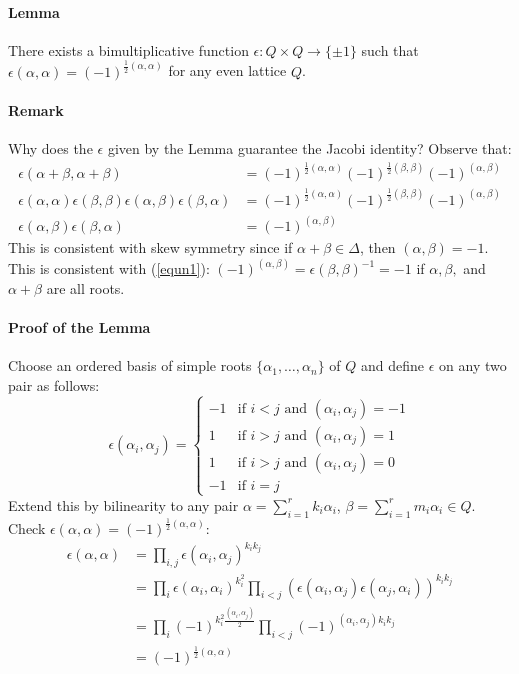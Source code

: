 \documentclass[11pt]{article}
\begin{document}
\paragraph{Lemma}
There exists a bimultiplicative function $\epsilon : Q \times Q \rightarrow
\{ \pm 1 \}$ such that $\epsilon(\alpha,\alpha)=(-1)^{\frac{1}{2}(\alpha,
\alpha)}$ for any even lattice $Q$.

\paragraph{Remark} Why does the $\epsilon$ given by the Lemma guarantee
the Jacobi identity? Observe that:
\begin{align*}
\epsilon(\alpha+\beta,\alpha+\beta)&=(-1)^{\frac{1}{2}(\alpha,\alpha)}
(-1)^{\frac{1}{2}(\beta,\beta)}(-1)^{(\alpha,\beta)} \\
\epsilon(\alpha,\alpha)\epsilon(\beta,\beta)\epsilon(\alpha,\beta)\epsilon(
\beta,\alpha)&= (-1)^{\frac{1}{2}(\alpha,\alpha)}
(-1)^{\frac{1}{2}(\beta,\beta)}(-1)^{(\alpha,\beta)} \\
\epsilon(\alpha,\beta)\epsilon(\beta,\alpha)&=(-1)^{(\alpha,\beta)}
\end{align*}
This is consistent with skew symmetry since if $\alpha+\beta \in \Delta$, then
$(\alpha,\beta)=-1$. This is consistent with (\ref{equn1}): $(-1)^{(\alpha,
\beta)}=\epsilon(\beta,\beta)^{-1}=-1$ if $\alpha, \beta,$ and $\alpha+\beta$
are all roots.

\paragraph{Proof of the Lemma}
Choose an ordered basis of simple roots $\{ \alpha_1, \dots , \alpha_n \}$
of $Q$ and define $\epsilon$ on any two pair as follows:
\begin{equation*}
\epsilon(\alpha_i,\alpha_j)= \begin{cases}
-1 & \text{if $i<j$ and $(\alpha_i,\alpha_j)=-1$} \\
1  & \text{if $i>j$ and $(\alpha_i,\alpha_j)=1$} \\
1  & \text{if $i>j$ and $(\alpha_i,\alpha_j)=0$} \\
-1 & \text{if $i=j$} \end{cases}
\end{equation*}
Extend this by bilinearity to any pair $\alpha = \sum_{i=1}^r k_i\alpha_i$,
$\beta=\sum_{i=1}^r m_i \alpha_i \in Q$. Check $\epsilon(\alpha,\alpha)
=(-1)^{\frac{1}{2}(\alpha,\alpha)}$:
\begin{align*}
\epsilon(\alpha,\alpha) &= \prod_{i,j}\epsilon(\alpha_i,\alpha_j)^{k_ik_j} \\
 &= \prod_i \epsilon(\alpha_i,\alpha_i)^{k_i^2} \prod_{i<j} \left( 
\epsilon(\alpha_i,\alpha_j)\epsilon(\alpha_j,\alpha_i) \right)^{k_ik_j} \\
&= \prod_i (-1)^{k_i^2 \frac{(\alpha_i,\alpha_j)}{2}}\prod_{i<j}(-1)^{(
\alpha_i,\alpha_j)k_ik_j} \\
&= (-1)^{\frac{1}{2}(\alpha,\alpha)}
\end{align*}
\end{document}

